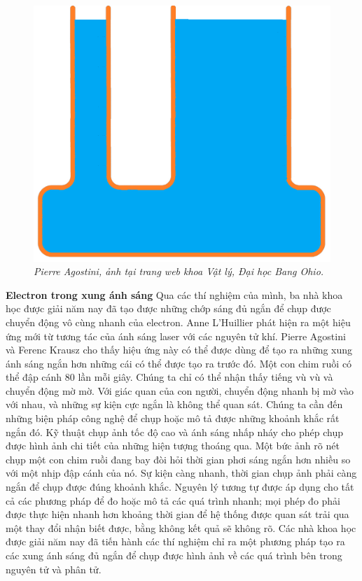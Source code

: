 \begin{multicols}{2}
\begin{figure}[H]
		\includegraphics[width= 1\linewidth]{8}
		\caption{\small\textit{\color{timhieukhoahoc}Pierre Agostini, ảnh tại trang web khoa Vật lý, Đại học Bang Ohio.}}
		\vspace*{-10pt}
	\end{figure}
	\textbf{\color{timhieukhoahoc}Electron trong xung ánh sáng}
	\vskip 0.1cm
	Qua các thí nghiệm của mình, ba nhà khoa học được giải năm nay đã tạo được những chớp sáng đủ ngắn để chụp được chuyển động vô cùng nhanh của electron. Anne L'Huillier phát hiện ra một hiệu ứng mới từ tương tác của ánh sáng laser với các nguyên tử khí. Pierre Agostini và Ferenc Krausz cho thấy hiệu ứng này có thể được dùng để tạo ra những xung ánh sáng ngắn hơn những cái có thể được tạo ra trước đó.
	\vskip 0.1cm
	Một con chim ruồi có thể đập cánh $80$ lần mỗi giây. Chúng ta chỉ có thể nhận thấy tiếng vù vù và chuyển động mờ mờ. Với giác quan của con người, chuyển động nhanh bị mờ vào với nhau, và những sự kiện cực ngắn là không thể quan sát. Chúng ta cần đến những biện pháp công nghệ để chụp hoặc mô tả được những khoảnh khắc rất ngắn đó.
	\vskip 0.1cm
	Kỹ thuật chụp ảnh tốc độ cao và ánh sáng nhấp nháy cho phép chụp được hình ảnh chi tiết của những hiện tượng thoáng qua. Một bức ảnh rõ nét chụp một con chim ruồi đang bay đòi hỏi thời gian phơi sáng ngắn hơn nhiều so với một nhịp đập cánh của nó.
	\vskip 0.1cm
	Sự kiện càng nhanh, thời gian chụp ảnh phải càng ngắn để chụp được đúng khoảnh khắc.
	\vskip 0.1cm
	Nguyên lý tương tự được áp dụng cho tất cả các phương pháp để đo hoặc mô tả các quá trình nhanh; mọi phép đo phải được thực hiện nhanh hơn khoảng thời gian để hệ thống được quan sát trải qua một thay đổi nhận biết được, bằng không kết quả sẽ không rõ. Các nhà khoa học được giải năm nay đã tiến hành các thí nghiệm chỉ ra một phương pháp tạo ra các xung ánh sáng đủ ngắn để chụp được hình ảnh về các quá trình bên trong nguyên tử và phân tử.

\end{multicols}
